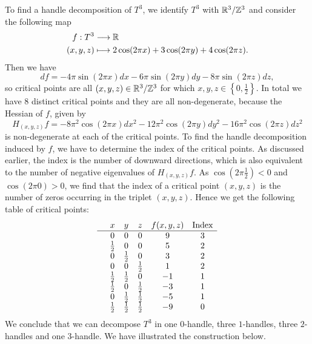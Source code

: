 \begin{eg}[$T^{3} = S^{1} \times S^{1} \times S^{1}$]
    \label{eg:handle-decomposition-three-torus}
    To find a handle decomposition of $T^3$, we identify $T^{3}$ with $\mathbb{R}^3 / \mathbb{Z}^{3}$ and consider the following map
    \begin{align*}
        f: T^{3} &\longrightarrow \mathbb{R} \\
        (x, y, z) &\longmapsto 2\cos (2 \pi x) + 3\cos ( 2 \pi y) + 4 \cos(2 \pi z)
    .\end{align*}
    Then we have
    \[
        df =
        -4\pi \sin (2 \pi x) dx
        -6 \pi \sin ( 2 \pi y) dy
        - 8 \pi \sin(2 \pi z) dz
    ,\] 
    so critical points are all $(x, y, z) \in \mathbb{R}^3 / \mathbb{Z}^3$ for which  $x, y, z \in \left\{0, \frac{1}{2} \right\}$.
    In total we have $8$ distinct critical points and they are all non-degenerate, because the Hessian of $f$, given by
    \[
        H_{(x, y, z)} f =
        - 8 \pi^2  \cos (2 \pi x) dx^2
        -12\pi^2 \cos ( 2 \pi y) dy^2
        -16 \pi^2 \cos(2 \pi z) dz^2
    \] 
    is non-degenerate at each of the critical points.
    To find the handle decomposition induced by $f$, we have to determine the index of the critical points.
    As discussed earlier, the index is the number of downward directions, which is also equivalent to the number of negative eigenvalues of $H_{(x, y, z)}f$.
    As $\cos(2 \pi \frac{1}{2}) < 0$ and $\cos(2 \pi 0) > 0$, we find that the index of a critical point $(x, y, z)$ is the number of zeros occurring in the triplet $(x, y, z)$. Hence we get the following table of critical points:
    \[\begin{array}{cccccc}
  & x & y  & z & f(x, y, z) & \text{Index}\\ \hline
  & 0 & 0 & 0 & 9 & 3 \\
& \frac{1}{2} & 0 & 0 & 5 & 2 \\
& 0 & \frac{1}{2} & 0 & 3 & 2 \\
& 0 & 0 & \frac{1}{2} & 1 & 2 \\
& \frac{1}{2} & \frac{1}{2} & 0 & -1 & 1 \\
& \frac{1}{2} & 0 & \frac{1}{2} & -3 & 1 \\
& 0 & \frac{1}{2} & \frac{1}{2} & -5 & 1 \\
& \frac{1}{2} & \frac{1}{2} & \frac{1}{2} & -9 & 0 \\
    \end{array}\]
    We conclude that we can decompose $T^3$ in one $0$-handle, three $1$-handles, three $2$-handles and one $3$-handle. We have illustrated the construction below.


\end{eg}
